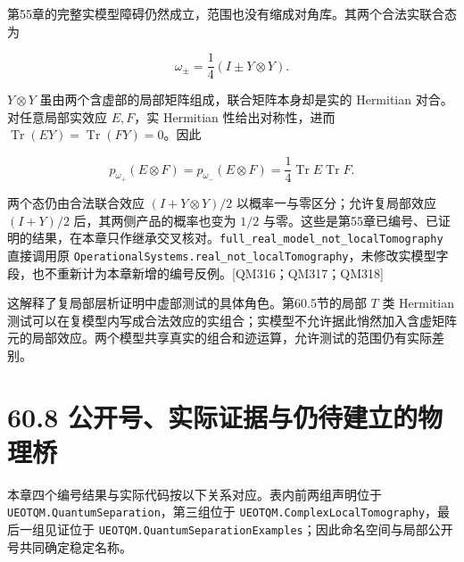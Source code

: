 \documentclass[
  11pt,
  oneside]{book}
\begin{document}
第55章的完整实模型障碍仍然成立，范围也没有缩成对角库。其两个合法实联合态为

\[
\omega_\pm=\frac14(I\pm Y\otimes Y).
\]

\(Y\otimes Y\) 虽由两个含虚部的局部矩阵组成，联合矩阵本身却是实的
Hermitian 对合。对任意局部实效应 \(E,F\)，实 Hermitian
性给出对称性，进而
\(\operatorname{Tr}(EY)=\operatorname{Tr}(FY)=0\)。因此

\[
p_{\omega_+}(E\otimes F)
=p_{\omega_-}(E\otimes F)
=\frac14\operatorname{Tr}E\operatorname{Tr}F.
\]

两个态仍由合法联合效应 \((I+Y\otimes Y)/2\)
以概率一与零区分；允许复局部效应 \((I+Y)/2\) 后，其两侧产品的概率也变为
\(1/2\)
与零。这些是第55章已编号、已证明的结果，在本章只作继承交叉核对。\texttt{full\_\allowbreak real\_\allowbreak model\_\allowbreak not\_\allowbreak local\allowbreak Tomography}
直接调用原
\texttt{Operational\allowbreak Systems.\allowbreak real\_\allowbreak not\_\allowbreak local\allowbreak Tomography}，未修改实模型字段，也不重新计为本章新增的编号反例。{[}QM316；QM317；QM318{]}

这解释了复局部层析证明中虚部测试的具体角色。第60.5节的局部 \(T\) 类
Hermitian
测试可以在复模型内写成合法效应的实组合；实模型不允许据此悄然加入含虚矩阵元的局部效应。两个模型共享真实的组合和迹运算，允许测试的范围仍有实际差别。

\section{60.8 公开号、实际证据与仍待建立的物理桥}

本章四个编号结果与实际代码按以下关系对应。表内前两组声明位于
\texttt{UEOTQM.\allowbreak Quantum\allowbreak Separation}，第三组位于
\texttt{UEOTQM.\allowbreak Complex\allowbreak Local\allowbreak Tomography}，最后一组见证位于
\texttt{UEOTQM.\allowbreak Quantum\allowbreak Separation\allowbreak Examples}；因此命名空间与局部公开号共同确定稳定名称。
\end{document}
